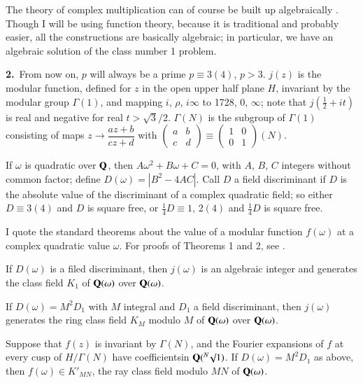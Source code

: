 The theory of complex multiplication can of course be built up algebraically \cite{art03-key3}. Though I will be using function theory, because it is traditional and probably easier, all the constructions are basically algebraic; in particular, we have an algebraic solution of the class number 1 problem.

\medskip
\noindent
{\bf 2.}~From now on, $p$ will always be a prime $p\equiv 3(4)$, $p>3$. $j(z)$ is the modular function, defined for $z$ in the open upper half plane $H$, invariant by the modular group $\Gamma(1)$, and mapping $i$, $\rho$, $i\infty$ to 1728, 0, $\infty$; note that $j(\frac{1}{2}+it)$ is real and negative for real $t>\surd 3/2$. $\Gamma(N)$ is the subgroup of $\Gamma(1)$ consisting of maps $z\to \dfrac{az+b}{cz+d}$ with $\left(\begin{smallmatrix} a & b\\ c & d\end{smallmatrix}\right)\equiv \left(\begin{smallmatrix} 1 & 0\\ 0 & 1\end{smallmatrix}\right)(N)$.

If $\omega$ is quadratic over $\mathbf{Q}$, then $A\omega^{2}+B\omega+C=0$, with $A$, $B$, $C$ integers without common factor; define $D(\omega)=|B^{2}-4AC|$. Call $D$ a field discriminant if $D$ is the absolute value of the discriminant of a complex quadratic field; so either $D\equiv 3(4)$ and $D$ is square free, or $\frac{1}{4}D\equiv 1$, $2(4)$ and $\frac{1}{4}D$ is square free.

I quote the standard theorems about the value of a modular function $f(\omega)$ at a complex quadratic value $\omega$. For proofs of Theorems 1 and 2, see \cite{art03-key3}.

\begin{theorem}\label{art03-thm1}
If $D(\omega)$ is a filed discriminant, then $j(\omega)$ is an algebraic integer and generates the class field $K_{1}$ of $\mathbf{Q}(\omega)$ over $\mathbf{Q}(\omega)$.
\end{theorem}

\begin{theorem}\label{art03-thm2}
If $D(\omega)=M^{2}D_{1}$ with $M$ integral and $D_{1}$ a field discriminant, then $j(\omega)$ generates the ring class field $K_{M}$ modulo $M$ of $\mathbf{Q}(\omega)$ over $\mathbf{Q}(\omega)$.
\end{theorem}

\begin{theorem}\label{art03-thm3}
Suppose that $f(z)$ is invariant by $\Gamma(N)$, and the Fourier expansions of $f$ at every cusp of $H/\Gamma(N)$ have coefficients\pageoriginale in $\mathbf{Q}({}^{N}\surd 1)$. If $D(\omega)=M^{2}D_{1}$ as above, then $f(\omega)\in K'_{MN}$, the ray class field modulo $MN$ of $\mathbf{Q}(\omega)$.
\end{theorem}

